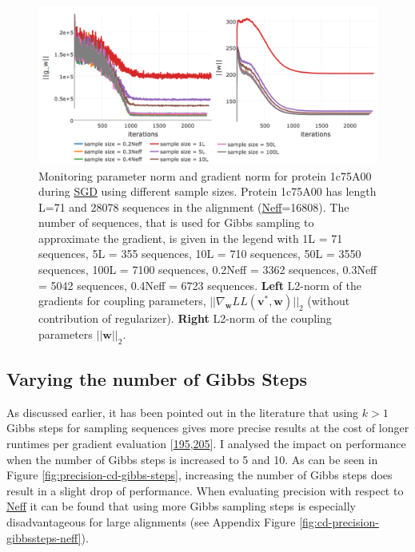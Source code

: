 \documentclass[11pt,a4paper,twoside]{book}
\renewcommand{\v}{\mathbf{v}}
\newcommand{\w}{\mathbf{w}}
\theoremstyle{definition}
\theoremstyle{definition}
\theoremstyle{remark}
\begin{document}
\begin{figure}

{\centering \includegraphics[width=1\linewidth]{img/full_likelihood/gibbs_sampling/1c75A00_gradient_and_parameter_norm_for_samplesizes} 

}

\caption{Monitoring parameter norm and
gradient norm for protein 1c75A00 during \protect\hyperlink{abbrev}{SGD}
using different sample sizes. Protein 1c75A00 has length L=71 and 28078
sequences in the alignment (\protect\hyperlink{abbrev}{Neff}=16808). The
number of sequences, that is used for Gibbs sampling to approximate the
gradient, is given in the legend with 1L = 71 sequences, 5L = 355
sequences, 10L = 710 sequences, 50L = 3550 sequences, 100L = 7100
sequences, 0.2Neff = 3362 sequences, 0.3Neff = 5042 sequences, 0.4Neff =
6723 sequences. \textbf{Left} L2-norm of the gradients for coupling
parameters, \(||\nabla_{\w} L\!L(\v^*, \w)||_2\) (without contribution
of regularizer). \textbf{Right} L2-norm of the coupling parameters
\(||\w||_2\).}\label{fig:cd-samplesize-protein1c75a00}
\end{figure}

\subsection{Varying the number of Gibbs Steps}\label{cd-gibbs-steps}

As discussed earlier, it has been pointed out in the literature that
using \(k>1\) Gibbs steps for sampling sequences gives more precise
results at the cost of longer runtimes per gradient evaluation
{[}\protect\hyperlink{ref-Bengio2009}{195},\protect\hyperlink{ref-Tieleman2008}{205}{]}.
I analysed the impact on performance when the number of Gibbs steps is
increased to 5 and 10. As can be seen in Figure
\ref{fig:precision-cd-gibbs-steps}, increasing the number of Gibbs steps
does result in a slight drop of performance. When evaluating precision
with respect to \protect\hyperlink{abbrev}{Neff} it can be found that
using more Gibbs sampling steps is especially disadvantageous for large
alignments (see Appendix Figure \ref{fig:cd-precision-gibbssteps-neff}).
\end{document}
